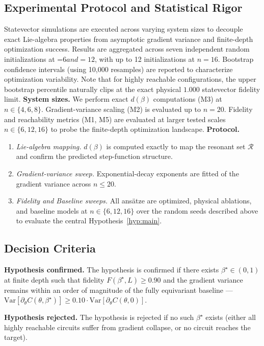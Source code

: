\documentclass[10pt,twocolumn]{article}
\theoremstyle{remark}
\begin{document}
\subsection{Experimental Protocol and Statistical Rigor}

Statevector simulations are executed across varying system sizes to decouple exact Lie-algebra properties from asymptotic gradient variance and finite-depth optimization success. Results are aggregated across seven independent random initializations at =6$ and =12$, with up to 12 initializations at $n=16$. Bootstrap confidence intervals (using 10,000 resamples) are reported to characterize optimization variability. Note that for highly reachable configurations, the upper bootstrap percentile naturally clips at the exact physical $1.000$ statevector fidelity limit.
\textbf{System sizes.} We perform exact $d(\beta)$ computations (M3) at $n \in \{4, 6, 8\}$. Gradient-variance scaling (M2) is evaluated up to $n=20$. Fidelity and reachability metrics (M1, M5) are evaluated at larger tested scales $n \in \{6, 12, 16\}$ to probe the finite-depth optimization landscape.
\textbf{Protocol.}
\begin{enumerate}
    \item \textit{Lie-algebra mapping.} $d(\beta)$ is computed exactly to map the resonant set $\mathcal{R}$ and confirm the predicted step-function structure.
    \item \textit{Gradient-variance sweep.} Exponential-decay exponents are fitted of the gradient variance across $n \le 20$.
    \item \textit{Fidelity and Baseline sweeps.} All ans\"atze are optimized, physical ablations, and baseline models at $n \in \{6, 12, 16\}$ over the random seeds described above to evaluate the central Hypothesis~\ref{hyp:main}.
\end{enumerate}

\subsection{Decision Criteria}

\textbf{Hypothesis confirmed.} The hypothesis is confirmed if there exists $\beta^\star \in (0, 1)$ at finite depth such that fidelity $F(\beta^\star, L) \ge 0.90$ and the gradient variance remains within an order of magnitude of the fully equivariant baseline --- $\text{Var}[\partial_\theta C(\theta, \beta^\star)] \ge 0.10 \cdot \text{Var}[\partial_\theta C(\theta, 0)]$.

\textbf{Hypothesis rejected.} The hypothesis is rejected if no such $\beta^\star$ exists (either all highly reachable circuits suffer from gradient collapse, or no circuit reaches the target).
\end{document}
